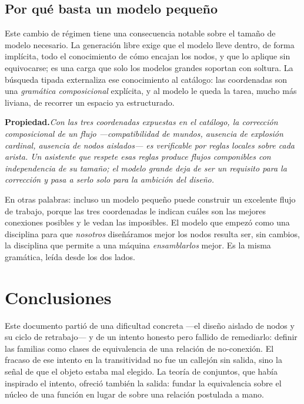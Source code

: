 \documentclass[11pt,a4paper]{article}
\theoremstyle{definition}
\theoremstyle{plain}
\newcommand{\prop}[1]{\medskip\noindent\textbf{Propiedad.}\enspace\emph{#1}\medskip}
\begin{document}
\subsection{Por qué basta un modelo pequeño}

Este cambio de régimen tiene una consecuencia notable sobre el tamaño de modelo
necesario. La generación libre exige que el modelo lleve dentro, de forma implícita,
todo el conocimiento de cómo encajan los nodos, y que lo aplique sin equivocarse; es
una carga que solo los modelos grandes soportan con soltura. La búsqueda tipada
externaliza ese conocimiento al catálogo: las coordenadas son una \emph{gramática
composicional} explícita, y al modelo le queda la tarea, mucho más liviana, de
recorrer un espacio ya estructurado.

\prop{Con las tres coordenadas expuestas en el catálogo, la corrección
composicional de un flujo ---compatibilidad de mundos, ausencia de explosión
cardinal, ausencia de nodos aislados--- es verificable por reglas locales sobre cada
arista. Un asistente que respete esas reglas produce flujos componibles con
independencia de su tamaño; el modelo grande deja de ser un requisito para la
corrección y pasa a serlo solo para la ambición del diseño.}

En otras palabras: incluso un modelo pequeño puede construir un excelente flujo de
trabajo, porque las tres coordenadas le indican cuáles son las mejores conexiones
posibles y le vedan las imposibles. El modelo que empezó como una disciplina para
que \emph{nosotros} diseñáramos mejor los nodos resulta ser, sin cambios, la
disciplina que permite a una máquina \emph{ensamblarlos} mejor. Es la misma
gramática, leída desde los dos lados.

\section{Conclusiones}

Este documento partió de una dificultad concreta ---el diseño aislado de nodos y su
ciclo de retrabajo--- y de un intento honesto pero fallido de remediarlo: definir
las familias como clases de equivalencia de una relación de no-conexión. El fracaso
de ese intento en la transitividad no fue un callejón sin salida, sino la señal de
que el objeto estaba mal elegido. La teoría de conjuntos, que había inspirado el
intento, ofreció también la salida: fundar la equivalencia sobre el núcleo de una
función en lugar de sobre una relación postulada a mano.
\end{document}
